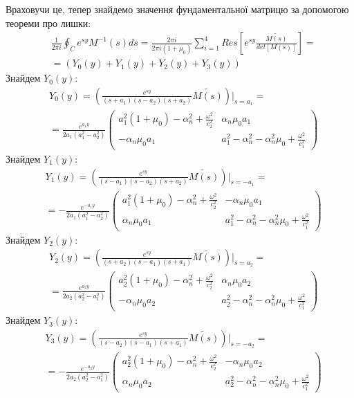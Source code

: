 Враховучи це, тепер знайдемо значення фундаментальної матрицю за допомогою теореми про лишки:
\begin{align*}
    &\frac{1}{2\pi i} \oint_C e^{sy} M^{-1}(s)ds = \frac{2 \pi i}{2 \pi i (1 + \mu_0)} \sum_{i=1}^{4} Res\left[ e^{sy} \frac{\widetilde{M(s)}}{det[M(s)]} \right] = \\
    & = \left(Y_0(y) + Y_1(y) + Y_2(y) + Y_3(y) \right)
\end{align*}
Знайдем $Y_0(y)$:
\begin{align}
    &Y_0(y) =  \left( \frac{e^{sy}}{(s+a_1)(s - a_2)(s + a_2)} \widetilde{M(s)} \right) \Big|_{s=a_1} = \nonumber \\
    &=\frac{e^{a_1 y}}{2a_1 (a_1^2 - a_2^2)} \begin{pmatrix}
        a_1^2 (1 + \mu_0) -\alpha_n^2 + \frac{\omega^2}{c_2^2} & \alpha_n \mu_0 a_1 \\
        -\alpha_n \mu_0 a_1 & a_1^2 - \alpha_n^2 - \alpha_n^2\mu_0 + \frac{\omega^2}{c_1^2}
    \end{pmatrix}
\end{align}
Знайдем $Y_1(y)$:
\begin{align}
    &Y_1(y) =  \left( \frac{e^{sy}}{(s-a_1)(s - a_2)(s + a_2)} \widetilde{M(s)} \right) \Big|_{s=-a_1} = \nonumber \\
    &=-\frac{e^{-a_1 y}}{2a_1 (a_1^2 - a_2^2)} \begin{pmatrix}
        a_1^2 (1 + \mu_0) -\alpha_n^2 + \frac{\omega^2}{c_2^2} & -\alpha_n \mu_0 a_1 \\
        \alpha_n \mu_0 a_1 & a_1^2 - \alpha_n^2 - \alpha_n^2\mu_0 + \frac{\omega^2}{c_1^2}
    \end{pmatrix}
\end{align}
Знайдем $Y_2(y)$:
\begin{align}
    &Y_2(y) =  \left( \frac{e^{sy}}{(s+a_2)(s - a_1)(s + a_1)} \widetilde{M(s)} \right) \Big|_{s=a_2} = \nonumber \\
    &=\frac{e^{a_2 y}}{2a_2 (a_2^2 - a_1^2)} \begin{pmatrix}
        a_2^2 (1 + \mu_0) -\alpha_n^2 + \frac{\omega^2}{c_2^2} & \alpha_n \mu_0 a_2 \\
        -\alpha_n \mu_0 a_2 & a_2^2 - \alpha_n^2 - \alpha_n^2\mu_0 + \frac{\omega^2}{c_1^2}
    \end{pmatrix}
\end{align}
Знайдем $Y_3(y)$:
\begin{align}
    &Y_3(y) =  \left( \frac{e^{sy}}{(s-a_2)(s - a_1)(s + a_1)} \widetilde{M(s)} \right) \Big|_{s=-a_2} = \nonumber \\
    &=-\frac{e^{-a_2 y}}{2a_2 (a_2^2 - a_1^2)} \begin{pmatrix}
        a_2^2 (1 + \mu_0) -\alpha_n^2 + \frac{\omega^2}{c_2^2} & -\alpha_n \mu_0 a_2 \\
        \alpha_n \mu_0 a_2 & a_2^2 - \alpha_n^2 - \alpha_n^2\mu_0 + \frac{\omega^2}{c_1^2}
    \end{pmatrix}
\end{align}

